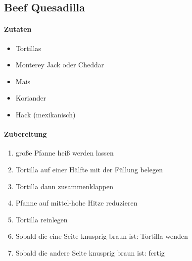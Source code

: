 \newpage
\subsection{Beef Quesadilla}
\paragraph{Zutaten}
\begin{itemize}[noitemsep]
	\item Tortillas
	\item Monterey Jack oder Cheddar
	\item Mais
	\item Koriander
	\item Hack (mexikanisch)
\end{itemize}
\paragraph{Zubereitung}
\begin{enumerate}[noitemsep]
	\item große Pfanne heiß werden lassen 
	\item Tortilla auf einer Hälfte mit der Füllung belegen
	\item Tortilla dann zusammenklappen
	\item Pfanne auf mittel-hohe Hitze reduzieren
	\item Tortilla reinlegen
	\item Sobald die eine Seite knusprig braun ist: Tortilla wenden
	\item Sobald die andere Seite knusprig braun ist: fertig
\end{enumerate}
